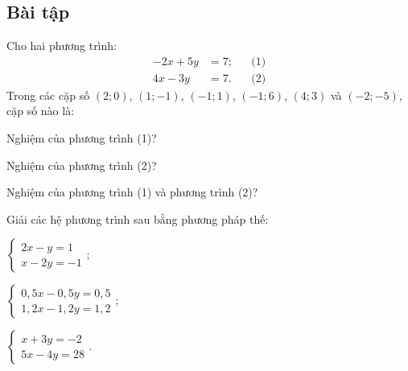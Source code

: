 \begin{exercises}
    \subsection{Bài tập}

    \begin{questions}[resume=SGK]
        \item Cho hai phương trình:
        \[
            \begin{aligned}
                -2x+5y&=7; &&\text{(1)}\\
                4x-3y&=7. &&\text{(2)}
            \end{aligned}
        \]
        Trong các cặp số $(2;0)$, $(1;-1)$, $(-1;1)$, $(-1;6)$, $(4;3)$ và $(-2;-5)$, cặp số nào là:
        \begin{questions}
            \item Nghiệm của phương trình (1)?

            \answerline

            \item Nghiệm của phương trình (2)?

            \answerline

            \item Nghiệm của phương trình (1) và phương trình (2)?

            \answerline
        \end{questions}

        \item Giải các hệ phương trình sau bằng phương pháp thế:
        \begin{questions}
            \item $\begin{cases}2x-y=1\\x-2y=-1\end{cases};$

            \answerline
            \answerline
            \answerline

            \item $\begin{cases}0{,}5x-0{,}5y=0{,}5\\1{,}2x-1{,}2y=1{,}2\end{cases};$

            \answerline
            \answerline
            \answerline

            \item $\begin{cases}x+3y=-2\\5x-4y=28\end{cases}.$


\end{questions}
\end{questions}
\end{exercises}
